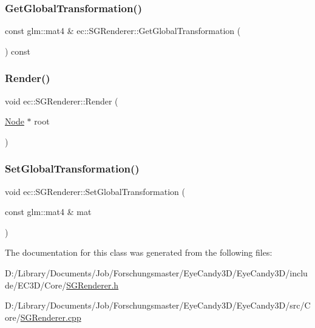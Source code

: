 \mbox{\label{classec_1_1_s_g_renderer_a3bdf58addcc513b55d46ca189346b38a}} 
\subsubsection{\texorpdfstring{Get\+Global\+Transformation()}{GetGlobalTransformation()}}
{\footnotesize\ttfamily const glm\+::mat4 \& ec\+::\+S\+G\+Renderer\+::\+Get\+Global\+Transformation (\begin{DoxyParamCaption}{ }\end{DoxyParamCaption}) const}

\mbox{\label{classec_1_1_s_g_renderer_a5cdbaa090334b75a28a9b13a1978384e}} 
\subsubsection{\texorpdfstring{Render()}{Render()}}
{\footnotesize\ttfamily void ec\+::\+S\+G\+Renderer\+::\+Render (\begin{DoxyParamCaption}\item[{\mbox{\hyperlink{classec_1_1_node}{Node}} $\ast$}]{root }\end{DoxyParamCaption})}

\mbox{\label{classec_1_1_s_g_renderer_adf1b4f90d296914597dd5f765fa8e9cd}} 
\subsubsection{\texorpdfstring{Set\+Global\+Transformation()}{SetGlobalTransformation()}}
{\footnotesize\ttfamily void ec\+::\+S\+G\+Renderer\+::\+Set\+Global\+Transformation (\begin{DoxyParamCaption}\item[{const glm\+::mat4 \&}]{mat }\end{DoxyParamCaption})}



The documentation for this class was generated from the following files\+:\begin{DoxyCompactItemize}
\item 
D\+:/\+Library/\+Documents/\+Job/\+Forschungsmaster/\+Eye\+Candy3\+D/\+Eye\+Candy3\+D/include/\+E\+C3\+D/\+Core/\mbox{\hyperlink{_s_g_renderer_8h}{S\+G\+Renderer.\+h}}\item 
D\+:/\+Library/\+Documents/\+Job/\+Forschungsmaster/\+Eye\+Candy3\+D/\+Eye\+Candy3\+D/src/\+Core/\mbox{\hyperlink{_s_g_renderer_8cpp}{S\+G\+Renderer.\+cpp}}\end{DoxyCompactItemize}
